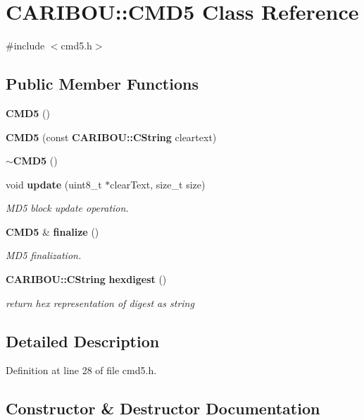 \section{C\-A\-R\-I\-B\-O\-U\-:\-:C\-M\-D5 Class Reference}
\label{class_c_a_r_i_b_o_u_1_1_c_m_d5}


{\ttfamily \#include $<$cmd5.\-h$>$}

\subsection*{Public Member Functions}
\begin{DoxyCompactItemize}
\item 
{\bf C\-M\-D5} ()
\item 
{\bf C\-M\-D5} (const {\bf C\-A\-R\-I\-B\-O\-U\-::\-C\-String} cleartext)
\item 
{\bf $\sim$\-C\-M\-D5} ()
\item 
void {\bf update} (uint8\-\_\-t $\ast$clear\-Text, size\-\_\-t size)
\begin{DoxyCompactList}\small\item\em M\-D5 block update operation. \end{DoxyCompactList}\item 
{\bf C\-M\-D5} \& {\bf finalize} ()
\begin{DoxyCompactList}\small\item\em M\-D5 finalization. \end{DoxyCompactList}\item 
{\bf C\-A\-R\-I\-B\-O\-U\-::\-C\-String} {\bf hexdigest} ()
\begin{DoxyCompactList}\small\item\em return hex representation of digest as string \end{DoxyCompactList}\end{DoxyCompactItemize}


\subsection{Detailed Description}


Definition at line 28 of file cmd5.\-h.



\subsection{Constructor \& Destructor Documentation}
